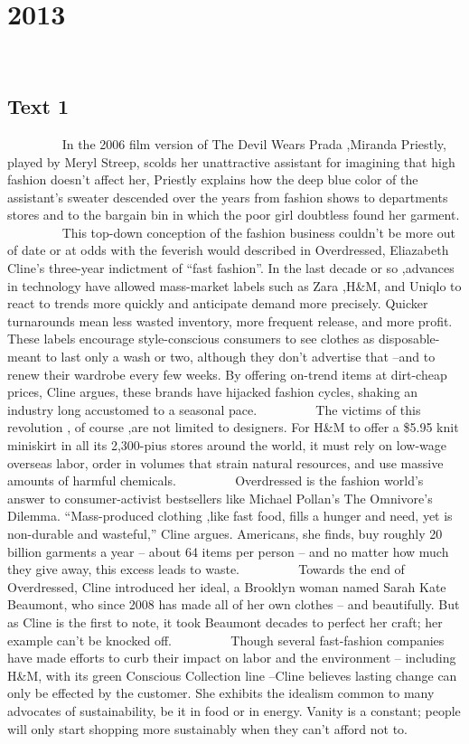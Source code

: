 
\section{2013}
 \subsection{Text 1}
    
    In the 2006 film version of The Devil Wears Prada ,Miranda Priestly, played by Meryl Streep, scolds her unattractive assistant for imagining that high fashion doesn’t affect her, Priestly explains how the deep blue color of the assistant’s sweater descended over the years from fashion shows to departments stores and to the bargain bin in which the poor girl doubtless found her garment.
    
    This top-down conception of the fashion business couldn’t be more out of date or at odds with the feverish would described in Overdressed, Eliazabeth Cline’s three-year indictment of “fast fashion”. In the last decade or so ,advances in technology have allowed mass-market labels such as Zara ,H\&M, and Uniqlo to react to trends more quickly and anticipate demand more precisely. Quicker turnarounds mean less wasted inventory, more frequent release, and more profit. These labels encourage style-conscious consumers to see clothes as disposable-meant to last only a wash or two, although they don’t advertise that –and to renew their wardrobe every few weeks. By offering on-trend items at dirt-cheap prices, Cline argues, these brands have hijacked fashion cycles, shaking an industry long accustomed to a seasonal pace.
    
    The victims of this revolution , of course ,are not limited to designers. For H\&M to offer a \$5.95 knit miniskirt in all its 2,300-pius stores around the world, it must rely on low-wage overseas labor, order in volumes that strain natural resources, and use massive amounts of harmful chemicals.
    
    Overdressed is the fashion world’s answer to consumer-activist bestsellers like Michael Pollan’s The Omnivore’s Dilemma. “Mass-produced clothing ,like fast food, fills a hunger and need, yet is non-durable and wasteful,” Cline argues. Americans, she finds, buy roughly 20 billion garments a year – about 64 items per person – and no matter how much they give away, this excess leads to waste.
    
    Towards the end of Overdressed, Cline introduced her ideal, a Brooklyn woman named Sarah Kate Beaumont, who since 2008 has made all of her own clothes – and beautifully. But as Cline is the first to note, it took Beaumont decades to perfect her craft; her example can’t be knocked off.
    
    Though several fast-fashion companies have made efforts to curb their impact on labor and the environment – including H\&M, with its green Conscious Collection line –Cline believes lasting change can only be effected by the customer. She exhibits the idealism common to many advocates of sustainability, be it in food or in energy. Vanity is a constant; people will only start shopping more sustainably when they can’t afford not to.
